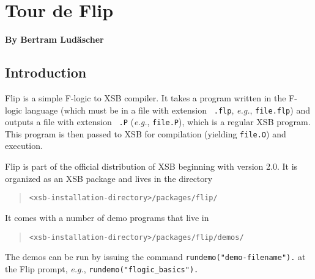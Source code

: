 \newcommand{\FdConstr}{\ensuremath{\stackrel{constr}{\Fd}}}
\newcommand{\MvdConstr}{\ensuremath{\stackrel{constr}{\Mvd}}}

\newlength{\flogicindent}


\newlength{\flength}
\newlength{\counterlength}


\newcommand{\la}{\ensuremath{\,\leftarrow\,}}

\newcommand{\anon}{\_}

\newcommand{\note}[1]{\textit{[[#1]]}}
\newcommand{\nterm}[1]{\ensuremath{\langle}\textit{#1}\ensuremath{\rangle}}


\newcommand{\NI}{\noindent}

\newcommand{\bs}{\ensuremath{\backslash}}
\newcommand{\FLIP}{{\mbox{\sc Flip}}\xspace}
\newcommand{\FLORID}{{\textsc{Florid}}\xspace}
\newcommand{\fl}{{F-logic}\xspace}


\newcommand{\consts}{\ensuremath{\mathcal{C}}}
\newcommand{\funcs}{\ensuremath{\mathcal{F}}}
\newcommand{\preds}{\ensuremath{\mathcal{P}}}
\newcommand{\vars}{\ensuremath{\mathcal{V}}}

\newcommand{\HU}{\ensuremath{U}}
\newcommand{\HB}{\ensuremath{\mathcal{HB}}}
\newcommand{\ext}{\ensuremath{^{\star}}}




\chapter{Tour de \FLIP}

\begin{center}
{\Large {\bf By Bertram Lud\"ascher}}
\end{center}

\section{Introduction}

\FLIP is a simple F-logic to XSB compiler. It takes a program written in the 
F-logic language \cite{KLW95} (which must be in a file with extension {\tt
  .flp}, {\it e.g.}, {\tt file.flp}) and outputs a file with extension {\tt
  .P} ({\it e.g.}, {\tt file.P}), which is a regular XSB program. This
program is then passed to XSB for compilation (yielding {\tt file.O}) and
execution. 

\FLIP is part of the official distribution of XSB beginning with version
2.0. It is organized as an XSB package and lives in the directory
\begin{quote}
 \verb|<xsb-installation-directory>/packages/flip/|  
\end{quote}
It comes with a number of demo programs that live in
\begin{quote}
 \verb|<xsb-installation-directory>/packages/flip/demos/|  
\end{quote}
The demos can be run by issuing the command
\verb|rundemo("demo-filename").| at the \FLIP prompt, {\it e.g.},
\verb|rundemo("flogic_basics").|

